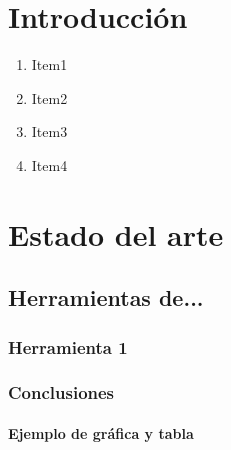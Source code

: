 \chapter{Introducción}

\begin{enumerate}
\item  Item1
\item  Item2
\item  Item3
\item  Item4
\end{enumerate}



\chapter{Estado del arte}
\section{Herramientas de...} 


\subsection{Herramienta 1}

\subsection{Conclusiones}

\subsubsection{Ejemplo de gráfica y tabla}

